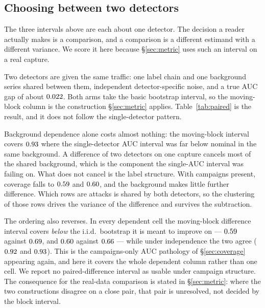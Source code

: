 \documentclass[a4paper,fleqn]{cas-dc}
\newcommand{\tabwidth}{\columnwidth}
\newcommand{\tabbody}{\small\setlength{\tabcolsep}{3.5pt}\renewcommand{\arraystretch}{1.08}}
\newcommand{\fulltab}{\renewcommand{\tabwidth}{\textwidth}\tabbody}
\begin{document}
\subsection{Choosing between two detectors}\label{sec:paired}
The three intervals above are each about one detector. The decision a reader actually makes is a
comparison, and a comparison is a different estimand with a different variance. We score it here
because \S\ref{sec:metric} uses such an interval on a real capture.

Two detectors are given the same traffic: one label chain and one background series shared between
them, independent detector-specific noise, and a true AUC gap of about $\PairTruth$. Both arms take
the basic bootstrap interval, so the moving-block column is the construction
\S\ref{sec:metric} applies. Table~\ref{tab:paired} is the result, and it does not follow
the single-detector pattern.

Background dependence alone costs almost nothing: the moving-block interval covers $0.93$
where the single-detector AUC interval was far below nominal in the same background. A difference
of two detectors on one capture cancels most of the shared background, which is the component the
single-AUC interval was failing on. What does not cancel is the label structure. With campaigns
present, coverage falls to $0.59$ and $0.60$, and the background makes little
further difference. Which rows are attacks is shared by both detectors, so the clustering of those
rows drives the variance of the difference and survives the subtraction.

The ordering also reverses. In every dependent cell the moving-block difference interval covers
\emph{below} the i.i.d.\ bootstrap it is meant to improve on --- $0.59$ against
$0.69$, and $0.60$ against $0.66$ --- while under independence the two
agree ($0.92$ and $0.93$). This is the campaigns-only AUC pathology of
\S\ref{sec:coverage} appearing again, and here it covers the whole dependent column rather than one
cell. We report no paired-difference interval as usable under campaign structure. The consequence
for the real-data comparison is stated in \S\ref{sec:metric}: where the two constructions disagree
on a close pair, that pair is unresolved, not decided by the block interval.
\begin{table}[!t]
\centering
\caption{Coverage of the paired AUC-difference interval, $n{=}5000$, $R{=}\PairR$, $B{=}200$. Two
detectors on one capture: shared labels and background, independent detector noise, true difference
$\PairTruth$. Both arms are basic bootstrap intervals, matching
\texttt{scripts/}\allowbreak\texttt{metric\_level\_intervals.py}. Cells are unconditional coverage
$\pm$ Monte Carlo SE. From
\texttt{diagnostics/}\allowbreak\texttt{paired\_difference.csv}.}\label{tab:paired}
\fulltab

\end{table}
\end{document}
